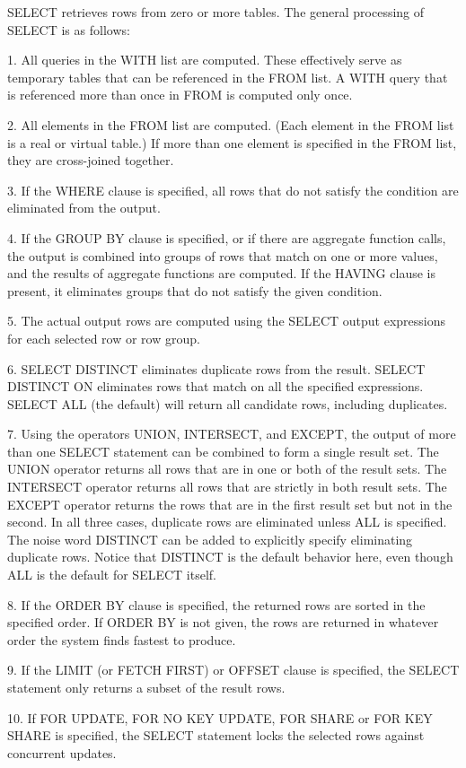 \begin{smallverbatim}
 

SELECT retrieves rows from zero or more tables. The general processing of SELECT is as follows:

1. All queries in the WITH list are computed. 
These effectively serve as temporary tables that can be referenced in the FROM list. 
A WITH query that is referenced more than once in FROM is computed only once. 


2. All elements in the FROM list are computed. 
(Each element in the FROM list is a real or virtual table.) 
If more than one element is specified in the FROM list, they are cross-joined together.


3. If the WHERE clause is specified, all rows that do not satisfy the condition 
are eliminated from the output. 


4. If the GROUP BY clause is specified, or if there are aggregate function calls, 
the output is combined into groups of rows that match on one or more values, 
and the results of aggregate functions are computed. 
If the HAVING clause is present, it eliminates groups that do not satisfy the 
given condition. 


5. The actual output rows are computed using the SELECT output expressions 
for each selected row or row group. 


6. SELECT DISTINCT eliminates duplicate rows from the result. 
SELECT DISTINCT ON eliminates rows that match on all the specified expressions. 
SELECT ALL (the default) will return all candidate rows, including duplicates. 


7. Using the operators UNION, INTERSECT, and EXCEPT, the output of more than one 
SELECT statement can be combined to form a single result set. 
The UNION operator returns all rows that are in one or both of the result sets. 
The INTERSECT operator returns all rows that are strictly in both result sets. 
The EXCEPT operator returns the rows that are in the first result set but not in the second. 
In all three cases, duplicate rows are eliminated unless ALL is specified. 
The noise word DISTINCT can be added to explicitly specify eliminating duplicate rows. 
Notice that DISTINCT is the default behavior here, even though ALL is the default for SELECT itself. 


8. If the ORDER BY clause is specified, the returned rows are sorted in the specified order. 
If ORDER BY is not given, the rows are returned in whatever order the system finds fastest to produce. 


9. If the LIMIT (or FETCH FIRST) or OFFSET clause is specified, the SELECT statement only returns 
a subset of the result rows. 

10. If FOR UPDATE, FOR NO KEY UPDATE, FOR SHARE or FOR KEY SHARE is specified, 
the SELECT statement locks the selected rows against concurrent updates. 

\end{smallverbatim}



